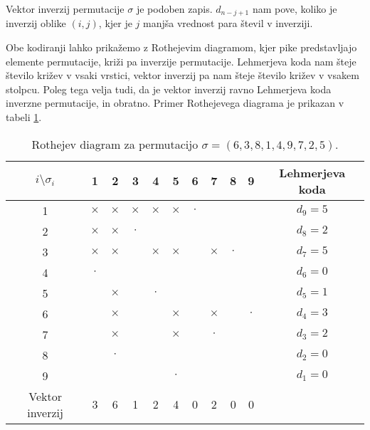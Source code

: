 \documentclass[a4paper, 12pt]{book}
\begin{document}
Vektor inverzij permutacije $\sigma$ je podoben zapis. $d_{n-j+1}$ nam pove, koliko je inverzij oblike $(i, j)$, kjer je $j$ manjša vrednost para števil v inverziji.

Obe kodiranji lahko prikažemo z Rothejevim diagramom, kjer pike predstavljajo elemente permutacije, križi pa inverzije permutacije. Lehmerjeva koda nam šteje število križev v vsaki vrstici, vektor inverzij pa nam šteje število križev v vsakem stolpcu. Poleg tega velja tudi, da je vektor inverzij ravno Lehmerjeva koda inverzne permutacije, in obratno. Primer Rothejevega diagrama je prikazan v tabeli \ref{tbl:rothejev_diagram}.

\begin{table}
    \begin{center}
        \begin{tabular}{ |c|c|c|c|c|c|c|c|c|c|c| } 
        \hline
            $i \setminus \sigma_i$ & 1 & 2 & 3 & 4 & 5 & 6 & 7 & 8 & 9 & Lehmerjeva koda  \\ 
        \hline
            1 & $\times$ & $\times$ & $\times$ & $\times$ & $\times$ & $\cdot$ & & & & $d_9 = 5$  \\ 
        \hline
            2 & $\times$ & $\times$ & $\cdot$ & & & & & & & $d_8 = 2$  \\ 
        \hline
            3 & $\times$ & $\times$ & & $\times$ & $\times$ & & $\times$ & $\cdot$ & & $d_7 = 5$  \\ 
        \hline
            4 & $\cdot$ & & & & & & & & & $d_6 = 0$  \\ 
        \hline
            5 & & $\times$ & & $\cdot$ & & & & & & $d_5 = 1$  \\ 
        \hline
            6 & & $\times$ & & & $\times$ & & $\times$ & & $\cdot$ & $d_4 = 3$  \\ 
        \hline
            7 & & $\times$ & & & $\times$ & & $\cdot$ & & & $d_3 = 2$  \\ 
        \hline
            8 & & $\cdot$ & & & & & & & & $d_2 = 0$  \\ 
        \hline
            9 & & & & & $\cdot$ & & & & & $d_1 = 0$  \\ 
        \hline
            Vektor inverzij & 3 & 6 & 1 & 2 & 4 & 0 & 2 & 0 & 0 &  \\ 
        \hline
        \end{tabular}
    \end{center}
    \caption{ Rothejev diagram za permutacijo $\sigma = (6, 3, 8, 1, 4, 9, 7, 2, 5)$. }
    \label{tbl:rothejev_diagram}
\end{table}
\end{document}
